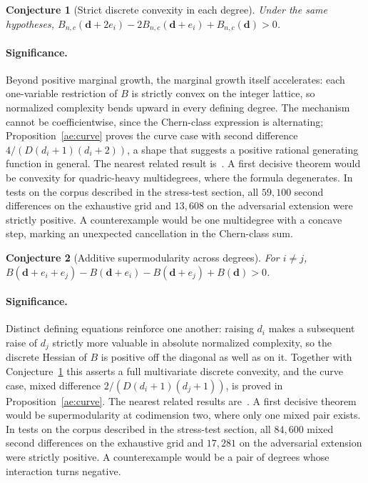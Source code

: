 \documentclass[11pt]{article}
\newtheorem{conjecture}{Conjecture}
\theoremstyle{definition}
\begin{document}
\begin{conjecture}[Strict discrete convexity in each degree]\label{ae2}
Under the same hypotheses, $B_{n,c}(\mathbf d+2e_i)-2B_{n,c}(\mathbf d+e_i)+B_{n,c}(\mathbf d)>0$.
\end{conjecture}

\paragraph{Significance.}
Beyond positive marginal growth, the marginal growth itself accelerates: each one-variable restriction of $B$ is strictly convex on the integer lattice, so normalized complexity bends upward in every defining degree.  The mechanism cannot be coefficientwise, since the Chern-class expression is alternating; Proposition~\ref{ae:curve} proves the curve case with second difference $4/(D(d_i+1)(d_i+2))$, a shape that suggests a positive rational generating function in general.  The nearest related result is~\cite{GL02}.  A first decisive theorem would be convexity for quadric-heavy multidegrees, where the formula degenerates.  In tests on the corpus described in the stress-test section, all $59{,}100$ second differences on the exhaustive grid and $13{,}608$ on the adversarial extension were strictly positive.  A counterexample would be one multidegree with a concave step, marking an unexpected cancellation in the Chern-class sum.

\begin{conjecture}[Additive supermodularity across degrees]\label{ae3}
For $i\ne j$, $B(\mathbf d+e_i+e_j)-B(\mathbf d+e_i)-B(\mathbf d+e_j)+B(\mathbf d)>0$.
\end{conjecture}

\paragraph{Significance.}
Distinct defining equations reinforce one another: raising $d_i$ makes a subsequent raise of $d_j$ strictly more valuable in absolute normalized complexity, so the discrete Hessian of $B$ is positive off the diagonal as well as on it.  Together with Conjecture~\ref{ae2} this asserts a full multivariate discrete convexity, and the curve case, mixed difference $2/(D(d_i+1)(d_j+1))$, is proved in Proposition~\ref{ae:curve}.  The nearest related results are~\cite{GL02,CO75}.  A first decisive theorem would be supermodularity at codimension two, where only one mixed pair exists.  In tests on the corpus described in the stress-test section, all $84{,}600$ mixed second differences on the exhaustive grid and $17{,}281$ on the adversarial extension were strictly positive.  A counterexample would be a pair of degrees whose interaction turns negative.
\end{document}
